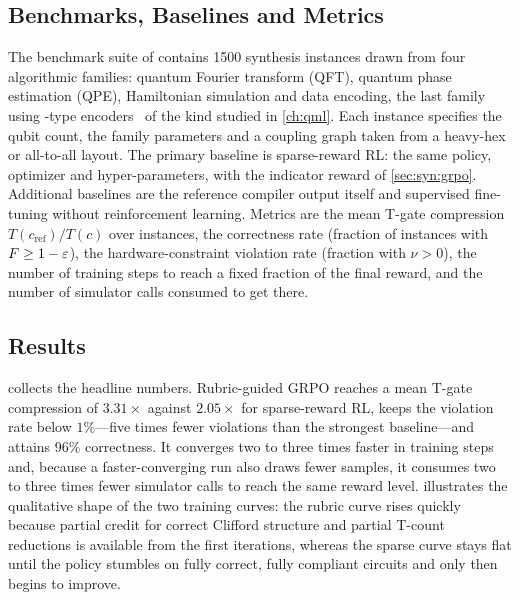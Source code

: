 \subsection{Benchmarks, Baselines and Metrics}\label{sec:syn:setup}

The benchmark suite of \cite{guo2026rubriq} contains \num{1500} synthesis instances drawn from four algorithmic families: quantum Fourier transform (QFT), quantum phase estimation (QPE), Hamiltonian simulation and data encoding, the last family using \qcrank{}-type encoders~\cite{balewski2024qcrank} of the kind studied in \cref{ch:qml}. Each instance specifies the qubit count, the family parameters and a coupling graph taken from a heavy-hex or all-to-all layout. The primary baseline is sparse-reward RL: the same policy, optimizer and hyper-parameters, with the indicator reward of \cref{sec:syn:grpo}. Additional baselines are the reference compiler output itself and supervised fine-tuning without reinforcement learning. Metrics are the mean T-gate compression $T(c_{\mathrm{ref}})/T(c)$ over instances, the correctness rate (fraction of instances with $F\ge 1-\varepsilon$), the hardware-constraint violation rate (fraction with $\nu>0$), the number of training steps to reach a fixed fraction of the final reward, and the number of simulator calls consumed to get there.

\subsection{Results}\label{sec:syn:mainresults}

 collects the headline numbers. Rubric-guided GRPO reaches a mean T-gate compression of $3.31\times$ against $2.05\times$ for sparse-reward RL, keeps the violation rate below $1\%$---five times fewer violations than the strongest baseline---and attains $96\%$ correctness. It converges two to three times faster in training steps and, because a faster-converging run also draws fewer samples, it consumes two to three times fewer simulator calls to reach the same reward level.  illustrates the qualitative shape of the two training curves: the rubric curve rises quickly because partial credit for correct Clifford structure and partial T-count reductions is available from the first iterations, whereas the sparse curve stays flat until the policy stumbles on fully correct, fully compliant circuits and only then begins to improve.

